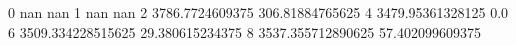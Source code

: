 0 nan nan
1 nan nan
2 3786.7724609375 306.81884765625
4 3479.95361328125 0.0
6 3509.334228515625 29.380615234375
8 3537.355712890625 57.402099609375
